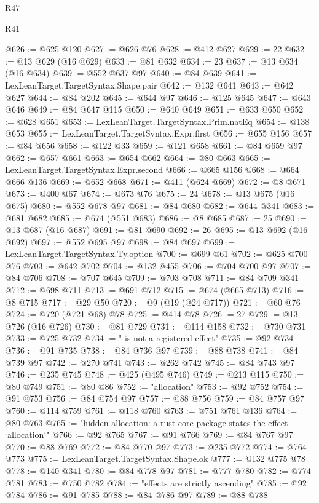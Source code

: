 \begin{lexlean}{R47}
\begin{lexlean}{R41}
\begin{coremodule}
{{{{{{{{{{{{{{{{{{{{{{{{{{{{{{{{{{{{{{{{{{{{{{{{{{{{{{{{{{{{{{{{{{{{{{{{{{{{{{{{{{{{{{{@626 := @625 @120
@627 := @626 @76
@628 := @412 @627
@629 := 22
@632 := @13 @629 (@16 @629)
@633 := @81 @632
@634 := 23
@637 := @13 @634 (@16 @634)
@639 := @552 @637 @97
@640 := @84 @639
@641 := LexLeanTarget.TargetSyntax.Shape.pair
@642 := @132 @641
@643 := @642 @627
@644 := @84 @202
@645 := @644 @97
@646 := @125 @645
@647 := @643 @646
@649 := @84 @647 @115
@650 := @640 @649
@651 := @633 @650
@652 := @628 @651
@653 := LexLeanTarget.TargetSyntax.Prim.natEq
@654 := @138 @653
@655 := LexLeanTarget.TargetSyntax.Expr.first
@656 := @655 @156
@657 := @84 @656
@658 := @122 @33
@659 := @121 @658
@661 := @84 @659 @97
@662 := @657 @661
@663 := @654 @662
@664 := @80 @663
@665 := LexLeanTarget.TargetSyntax.Expr.second
@666 := @665 @156
@668 := @664 @666 @136
@669 := @652 @668
@671 := @411 (@624 @669)
@672 := @8 @671
@673 := @400 @67
@674 := @673 @76
@675 := 24
@678 := @13 @675 (@16 @675)
@680 := @552 @678 @97
@681 := @84 @680
@682 := @644 @341
@683 := @681 @682
@685 := @674 (@551 @683)
@686 := @8 @685
@687 := 25
@690 := @13 @687 (@16 @687)
@691 := @81 @690
@692 := 26
@695 := @13 @692 (@16 @692)
@697 := @552 @695 @97
@698 := @84 @697
@699 := LexLeanTarget.TargetSyntax.Ty.option
@700 := @699 @61
@702 := @625 @700 @76
@703 := @642 @702
@704 := @132 @455
@706 := @704 @700 @97
@707 := @84 @706
@708 := @707 @645
@709 := @703 @708
@711 := @84 @709 @341
@712 := @698 @711
@713 := @691 @712
@715 := @674 (@665 @713)
@716 := @8 @715
@717 := @29 @50
@720 := @9 (@19 (@24 @717))
@721 := @60 @76
@724 := @720 (@721 @68) @78
@725 := @414 @78
@726 := 27
@729 := @13 @726 (@16 @726)
@730 := @81 @729
@731 := @114 @158
@732 := @730 @731
@733 := @725 @732
@734 := " is not a registered effect"
@735 := @92 @734
@736 := @91 @735
@738 := @84 @736 @97
@739 := @88 @738
@741 := @84 @739 @97
@742 := @270 @741
@743 := @262 @742
@745 := @84 @743 @97
@746 := @235 @745
@748 := @425 (@495 @746)
@749 := @213 @115
@750 := @80 @749
@751 := @80 @86
@752 := "allocation"
@753 := @92 @752
@754 := @91 @753
@756 := @84 @754 @97
@757 := @88 @756
@759 := @84 @757 @97
@760 := @114 @759
@761 := @118 @760
@763 := @751 @761 @136
@764 := @80 @763
@765 := "hidden allocation: a rust-core package states the effect `allocation`"
@766 := @92 @765
@767 := @91 @766
@769 := @84 @767 @97
@770 := @88 @769
@772 := @84 @770 @97
@773 := @235 @772
@774 := @764 @773
@775 := LexLeanTarget.TargetSyntax.Shape.ok
@777 := @132 @775 @78
@778 := @140 @341
@780 := @84 @778 @97
@781 := @777 @780
@782 := @774 @781
@783 := @750 @782
@784 := "effects are strictly ascending"
@785 := @92 @784
@786 := @91 @785
@788 := @84 @786 @97
@789 := @88 @788
}}}}}}}}}}}}}}}}}}}}}}}}}}}}}}}}}}}}}}}}}}}}}}}}}}}}}}}}}}}}}}}}}}}}}}}}}}}}}}}}}}}}}}}
\end{coremodule}
\end{lexlean}
\end{lexlean}
